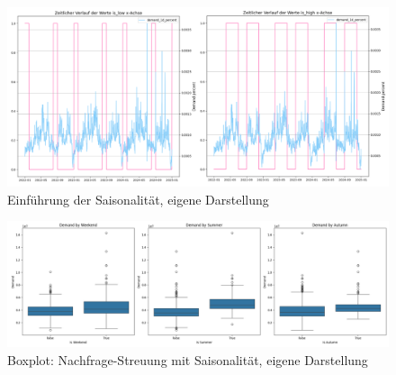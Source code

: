 \begin{figure}[H]
    \centering
    \includegraphics[width=1\linewidth]{images/nachfrageverlauf.png}
    \caption{Einführung der Saisonalität, eigene Darstellung}
    \label{fig:saisonalitätlinien}
\end{figure}

\begin{figure}[H]
    \centering
    \includegraphics[width=1\linewidth]{images/boxplot.png}
    \caption{Boxplot: Nachfrage-Streuung mit Saisonalität, eigene Darstellung}
    \label{fig:boxplotsaison}
\end{figure}
